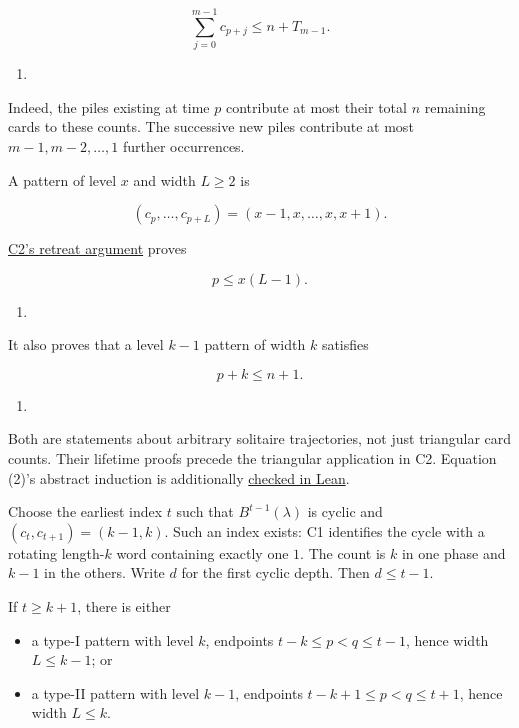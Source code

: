 \documentclass[11pt,a4paper]{article}
\providecommand{\tightlist}{\setlength{\itemsep}{0pt}\setlength{\parskip}{0pt}}
\begin{document}
\[
\sum_{j=0}^{m-1}c_{p+j}\le n+T_{m-1}.
\]

\begin{enumerate}
\def\labelenumi{(\arabic{enumi})}
\tightlist
\item
\end{enumerate}

Indeed, the piles existing at time \(p\) contribute at most their total \(n\) remaining cards to these counts. The successive new piles contribute at most \(m-1,m-2,\ldots,1\) further occurrences.

A pattern of level \(x\) and width \(L\ge2\) is

\[
(c_p,\ldots,c_{p+L})=(x-1,x,\ldots,x,x+1).
\]

\href{https://github.com/mpelteshki/climbing-to-the-frontier/blob/212bba53b1818c08c40b8c4b48f636651eaf6410/cagent/p3/c2/upper-bound-proof.md}{C2's retreat argument} proves

\[
p\le x(L-1).
\]

\begin{enumerate}
\def\labelenumi{(\arabic{enumi})}
\setcounter{enumi}{1}
\tightlist
\item
\end{enumerate}

It also proves that a level \(k-1\) pattern of width \(k\) satisfies

\[
p+k\le n+1.
\]

\begin{enumerate}
\def\labelenumi{(\arabic{enumi})}
\setcounter{enumi}{2}
\tightlist
\item
\end{enumerate}

Both are statements about arbitrary solitaire trajectories, not just triangular card counts. Their lifetime proofs precede the triangular application in C2. Equation (2)'s abstract induction is additionally \href{https://github.com/mpelteshki/climbing-to-the-frontier/blob/212bba53b1818c08c40b8c4b48f636651eaf6410/cagent/p3/lean/ProofPursuit/P3/C2SandwichBound.lean}{checked in Lean}.

Choose the earliest index \(t\) such that \(B^{t-1}(\lambda)\) is cyclic and \((c_t,c_{t+1})=(k-1,k)\). Such an index exists: C1 identifies the cycle with a rotating length-\(k\) word containing exactly one \(1\). The count is \(k\) in one phase and \(k-1\) in the others. Write \(d\) for the first cyclic depth. Then \(d\le t-1\).

If \(t\ge k+1\), there is either

\begin{itemize}
\tightlist
\item
  a type-I pattern with level \(k\), endpoints \(t-k\le p<q\le t-1\), hence width \(L\le k-1\); or
\item
  a type-II pattern with level \(k-1\), endpoints \(t-k+1\le p<q\le t+1\), hence width \(L\le k\).
\end{itemize}
\end{document}
